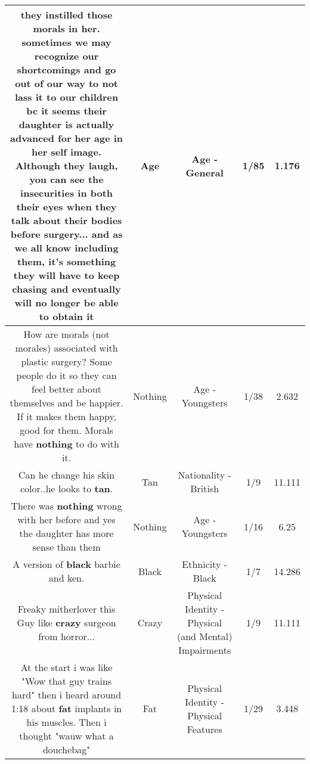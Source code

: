 \documentclass[11pt]{article}
\newlength\mylength
\begin{document}
\begin{center}
\begin{longtable}{|C{.65\mylength}|C{.30\mylength}|C{.12\mylength}|C{.12\mylength}|C{.12\mylength}|}
  \small they instilled those morals in her. sometimes we may recognize our shortcomings and go out of our way to not lass it to our children bc it seems their daughter is actually advanced for her \textbf{age} in her self image. Although they laugh, you can see the insecurities in both their eyes when they talk about their bodies before surgery... and as we all know including them, it's something they will have to keep chasing and eventually will no longer be able to obtain it\normalsize   & Age & Age - General & 1/85 & 1.176 \\  \hline
  \small How are morals (not morales) associated with plastic surgery? Some people do it so they can feel better about themselves and be happier. If it makes them happy, good for them. Morals have \textbf{nothing} to do with it.\normalsize   & Nothing & Age - Youngsters & 1/38 & 2.632 \\  \hline
  \small Can he change his skin color..he looks to \textbf{tan}.\normalsize   & Tan & Nationality - British & 1/9 & 11.111 \\  \hline
  \small There was \textbf{nothing} wrong with her before and yes the daughter has more sense than them\normalsize   & Nothing & Age - Youngsters & 1/16 & 6.25 \\  \hline
  \small A version of \textbf{black} barbie and ken.\normalsize   & Black & Ethnicity - Black & 1/7 & 14.286 \\  \hline
  \small Freaky mitherlover this Guy like \textbf{crazy} surgeon from horror...\normalsize   & Crazy & Physical Identity - Physical (and Mental) Impairments & 1/9 & 11.111 \\  \hline
  \small At the start i was like "Wow that guy trains hard" then i heard around 1:18 about \textbf{fat} implants in his muscles. Then i thought "wauw what a douchebag"\normalsize   & Fat & Physical Identity - Physical Features & 1/29 & 3.448 \\  \hline

\end{longtable}
\end{center}
\end{document}
